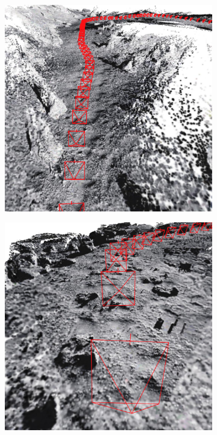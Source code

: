 \begin{figure}[t]
	\centering
	\begin{subfigure}[b]{0.3\linewidth}
		\includegraphics[width=\linewidth]{figures/3dgs/render-birdseye.png}
	\end{subfigure}
	\hfill
	\begin{subfigure}[b]{0.3\linewidth}
		\includegraphics[width=\linewidth,trim=10em 0 0 0,clip]{figures/3dgs/render-close.png}

\end{subfigure}
\end{figure}
